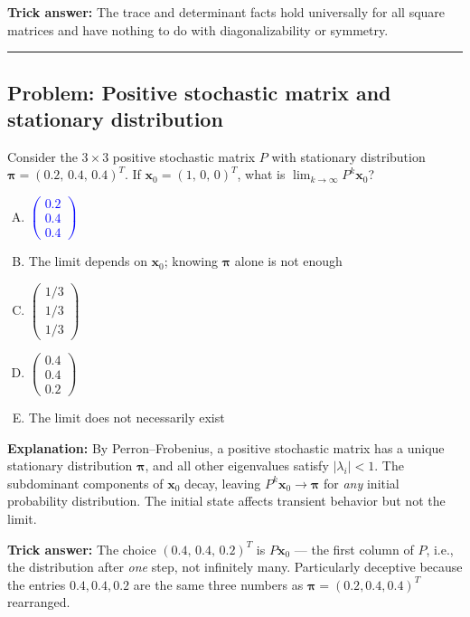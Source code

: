 \documentclass[12pt]{amsart}
\newcommand{\divider}{
  \vspace{-1em}
  \noindent
  \raisebox{-0.15ex}{\textbullet}%
  \hspace{0.5em}%
  \rule[0.5ex]{0.95\textwidth}{1.0pt}%
  \hspace{0.5em}%
  \raisebox{-0.15ex}{\textbullet}%
  \vspace{0em}
}
\begin{document}
\textbf{Trick answer:}
The trace and determinant facts hold universally for all square matrices
and have nothing to do with diagonalizability or symmetry.

\divider

\subsection*{Problem: Positive stochastic matrix and stationary distribution}

Consider the $3 \times 3$ positive stochastic matrix $P$ with stationary
distribution $\boldsymbol{\pi} = (0.2,\, 0.4,\, 0.4)^T$.
If $\mathbf{x}_0 = (1,\, 0,\, 0)^T$, what is
$\displaystyle\lim_{k \to \infty} P^k \mathbf{x}_0$?

\begin{enumerate}[(A)]
\item \textcolor{blue}{$\boldsymbol{\begin{pmatrix} 0.2 \\ 0.4 \\ 0.4 \end{pmatrix}}$}
\item The limit depends on $\mathbf{x}_0$; knowing
      $\boldsymbol{\pi}$ alone is not enough
\item $\begin{pmatrix} 1/3 \\ 1/3 \\ 1/3 \end{pmatrix}$
\item $\begin{pmatrix} 0.4 \\ 0.4 \\ 0.2 \end{pmatrix}$
\item The limit does not necessarily exist
\end{enumerate}

\textbf{Explanation:}
By Perron--Frobenius, a positive stochastic matrix has a unique stationary
distribution $\boldsymbol{\pi}$, and all other eigenvalues satisfy
$|\lambda_i| < 1$. The subdominant components of $\mathbf{x}_0$ decay,
leaving $P^k\mathbf{x}_0 \to \boldsymbol{\pi}$ for \emph{any} initial
probability distribution. The initial state affects transient behavior
but not the limit.

\textbf{Trick answer:}
The choice $(0.4,\, 0.4,\, 0.2)^T$ is $P\mathbf{x}_0$ --- the first
column of $P$, i.e., the distribution after \emph{one} step, not
infinitely many. Particularly deceptive because the entries $0.4, 0.4, 0.2$
are the same three numbers as $\boldsymbol{\pi} = (0.2, 0.4, 0.4)^T$
rearranged.
\end{document}
